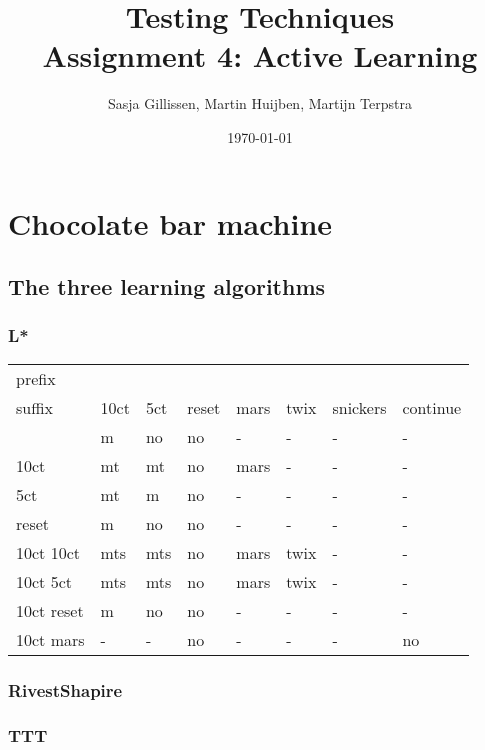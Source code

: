 \documentclass[11pt,a4paper]{article}
\author{Sasja Gillissen, Martin Huijben, Martijn Terpstra}
\date{\today}
\title{Testing Techniques\\
  \textbf{Assignment 4: Active Learning}}
\begin{document}
\maketitle

\section{Chocolate bar machine}
\subsection{The three learning algorithms}
\subsubsection{L*}
\newcommand{\mc}[2]{\multicolumn{#1}{c}{#2}}


\begin{tabular}{l | l l l l l l l}
	prefix\\suffix & 10ct & 5ct & reset & mars & twix & snickers & continue \\
	\hline
	\rowcolor{LightCyan}
	\textepsilon & m & no & no & - & - & - & - \\
	10ct & mt & mt & no & mars & - & - & - \\
	5ct & mt & m & no & - & - & - & - \\
	\rowcolor{LightCyan}
	reset & m & no & no & - & - & - & - \\
	\rowcolor{Gray}
	10ct 10ct & mts & mts & no & mars & twix & - & - \\
	\rowcolor{Gray}
	10ct 5ct & mts & mts & no & mars & twix & - & - \\
	\rowcolor{LightCyan}
	10ct reset & m & no & no & - & - & - & - \\
	10ct mars & - & - & no & - & - & - & no \\

\end{tabular}
\subsubsection{RivestShapire}
\subsubsection{TTT}
\end{document}
